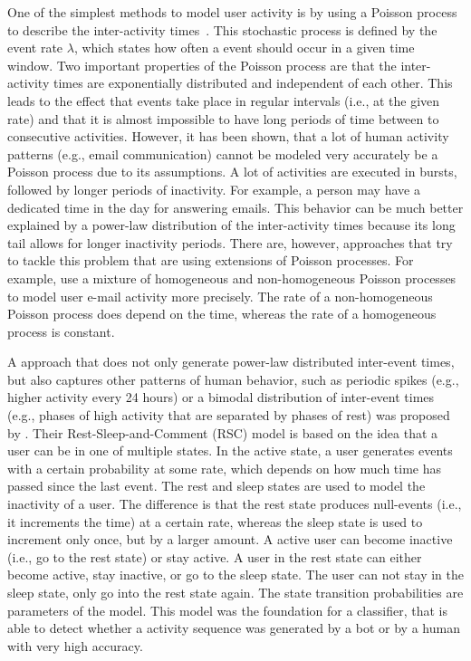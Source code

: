One of the simplest methods to model user activity is by using a Poisson process to describe the inter-activity times~\cite{Masuda2016, Vazquez2006}.
This stochastic process is defined by the event rate \( \lambda \), which states how often a event should occur in a given time window.
Two important properties of the Poisson process are that the inter-activity times are exponentially distributed and independent of each other.
This leads to the effect that events take place in regular intervals (i.e., at the given rate) and that it is almost impossible to have long periods of time between to consecutive activities.
However, it has been shown, that a lot of human activity patterns (e.g., email communication) cannot be modeled very accurately be a Poisson process due to its assumptions.
A lot of activities are executed in bursts, followed by longer periods of inactivity.
For example, a person may have a dedicated time in the day for answering emails.
This behavior can be much better explained by a power-law distribution of the inter-activity times because its long tail allows for longer inactivity periods.
There are, however, approaches that try to tackle this problem that are using extensions of Poisson processes.
For example, \citet{Malmgren2008} use a mixture of homogeneous and non-homogeneous Poisson processes to model user e-mail activity more precisely.
The rate of a non-homogeneous Poisson process does depend on the time, whereas the rate of a homogeneous process is constant.

A approach that does not only generate power-law distributed inter-event times, but also captures other patterns of human behavior, such as periodic spikes (e.g., higher activity every 24 hours) or a bimodal distribution of inter-event times (e.g., phases of high activity that are separated by phases of rest) was proposed by \citet{Costa2015}.
Their Rest-Sleep-and-Comment (RSC) model is based on the idea that a user can be in one of multiple states.
In the active state, a user generates events with a certain probability at some rate, which depends on how much time has passed since the last event.
The rest and sleep states are used to model the inactivity of a user.
The difference is that the rest state produces null-events (i.e., it increments the time) at a certain rate, whereas the sleep state is used to increment only once, but by a larger amount.
A active user can become inactive (i.e., go to the rest state) or stay active.
A user in the rest state can either become active, stay inactive, or go to the sleep state.
The user can not stay in the sleep state, only go into the rest state again.
The state transition probabilities are parameters of the model.
This model was the foundation for a classifier, that is able to detect whether a activity sequence was generated by a bot or by a human with very high accuracy.

